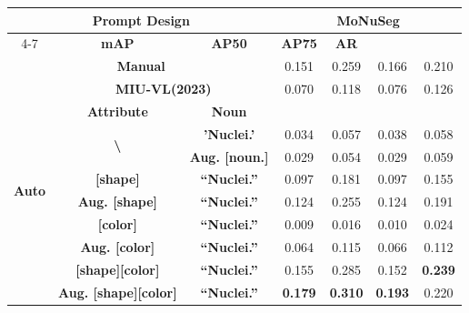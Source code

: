 \documentclass[journal,twoside,web]{ieeecolor}
\begin{document}
\begin{table}[h]
\begin{center}
{%
\begin{tabular}{ccccccc}
\toprule[1.5pt]
\multicolumn{3}{c}{\multirow{2}{*}{\textbf{Prompt Design}}} & \multicolumn{4}{c}{\textbf{MoNuSeg}} \\ \cline{4-7} 
\multicolumn{3}{c}{} & \textbf{mAP} & \textbf{AP50} & \textbf{AP75} & \textbf{AR} \\ \midrule[1.2pt]
\multicolumn{3}{c}{\textbf{Manual}} & 0.151 & 0.259 & 0.166 & 0.210 \\ \hline
\multirow{10}{*}{\textbf{Auto}} & \multicolumn{2}{c}{\textbf{MIU-VL(2023)\cite{qin2022medical}}} & 0.070 & 0.118 & 0.076 & 0.126 \\ \cline{2-7} 
 & \textbf{Attribute} & \textbf{Noun} &  &  &  &  \\ \cline{2-7} 
 & \multirow{2}{*}{\textbf{\textbackslash{}}} & \textbf{'Nuclei.'} & 0.034 & 0.057 & 0.038 & 0.058 \\
 &  & \textbf{Aug. {[}noun.{]}} & 0.029 & 0.054 & 0.029 & 0.059 \\ \cline{2-7} 
 & \textbf{{[}shape{]}} & \textbf{``Nuclei.''} & 0.097 & 0.181 & 0.097 & 0.155 \\
 & \textbf{Aug. {[}shape{]}} & \textbf{``Nuclei.''} & 0.124 & 0.255 & 0.124 & 0.191 \\ \cline{2-7} 
 & \textbf{{[}color{]}} & \textbf{``Nuclei.''} & 0.009 & 0.016 & 0.010 & 0.024 \\
 & \textbf{Aug. {[}color{]}} & \textbf{``Nuclei.''} & 0.064 & 0.115 & 0.066 & 0.112 \\ \cline{2-7} 
 & \textbf{{[}shape{]}{[}color{]}} & \textbf{``Nuclei.''} & 0.155 & 0.285 & 0.152 & \textbf{0.239} \\
 & \textbf{Aug. {[}shape{]}{[}color{]}} & \textbf{``Nuclei.''} & \textbf{0.179} & \textbf{0.310} & \textbf{0.193} & 0.220 \\ \bottomrule[1.5pt]
\end{tabular}
}
\end{center}
\end{table}
\end{document}
